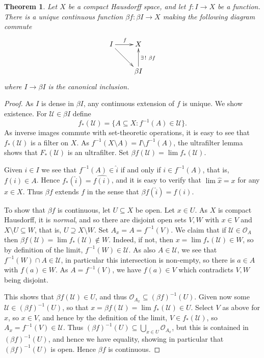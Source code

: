 \documentclass[a4paper,12pt]{article}
\theoremstyle{plain}
\newtheorem{theorem}[proposition]{Theorem}
\theoremstyle{definition}
\newcommand{\mc}[1]{\mathcal{#1}}
\begin{document}
\begin{theorem}
Let $X$ be a compact Hausdorff space, and let $f:I\rightarrow X$ be a function. There is a unique
continuous function $\beta f:\beta I\rightarrow X$ making the following diagram commute
\[ \xymatrix{ I \ar[r]^f \ar[rd] & X \\
& \beta I \ar[u]_{\exists\,!\ \beta f} } \]
where $I\rightarrow\beta I$ is the canonical inclusion.
\end{theorem}
\begin{proof}
As $I$ is dense in $\beta I$, any continuous extension of $f$ is unique.  We show existence.
For $\mc U\in\beta I$ define
\[ f_*(\mc U) = \{ A\subseteq X : f^{-1}(A) \in \mc U \}. \]
As inverse images commute with set-theoretic operations, it is easy to see that $f_*(\mc U)$ is a
filter on $X$.  As $f^{-1}(X\setminus A) = I \setminus f^{-1}(A)$, the ultrafilter lemma shows that
$F_*(\mc U)$ is an ultrafilter.  Set $\beta f(\mc U) = \lim f_*(\mc U)$.

Given $i\in I$ we see that $f^{-1}(A)\in\hat i$ if and only if $i\in f^{-1}(A)$, that is, $f(i)\in A$.
Hence $f_*(\hat i) = \widehat{f(i)}$, and it is easy to verify that $\lim \hat x = x$ for any $x\in X$.
Thus $\beta f$ extends $f$ in the sense that $\beta f(\hat i) = f(i)$.

To show that $\beta f$ is continuous, let $U\subseteq X$ be open.
Let $x\in U$.  As $X$ is compact Hausdorff, it is \emph{normal}, and so there are disjoint open sets $V,W$
with $x\in V$ and $X\setminus U \subseteq W$, that is, $U \supseteq X\setminus W$.  Set $A_x = A = f^{-1}(V)$.
We claim that if $\mc U\in\mc O_A$ then $\beta f(\mc U) = \lim f_*(\mc U) \not\in W$.  Indeed, if not, then
$x = \lim f_*(\mc U) \in W$, so by definition of the limit, $f^{-1}(W) \in \mc U$.  As also $A\in\mc U$,
we see that $f^{-1}(W) \cap A \in \mc U$, in particular this intersection is non-empty, so there is $a\in A$
with $f(a)\in W$.  As $A=f^{-1}(V)$, we have $f(a)\in V$ which contradicts $V,W$ being disjoint.

This shows that $\beta f(\mc U) \in U$, and thus $\mc O_{A_x} \subseteq (\beta f)^{-1}(U)$.  Given now
some $\mc U \in (\beta f)^{-1}(U)$, so that $x = \beta f(\mc U) = \lim f_*(\mc U)\in U$.  Select $V$ as
above for $x$, so $x\in V$, and hence by the definition of the limit, $V\in f_*(\mc U)$, so $A_x = f^{-1}(V)
\in \mc U$.  Thus $(\beta f)^{-1}(U) \subseteq \bigcup_{x\in U} \mc O_{A_x}$, but this is contained in
$(\beta f)^{-1}(U)$, and hence we have equality, showing in particular that $(\beta f)^{-1}(U)$ is open.
Hence $\beta f$ is continuous.
\end{proof}
\end{document}
